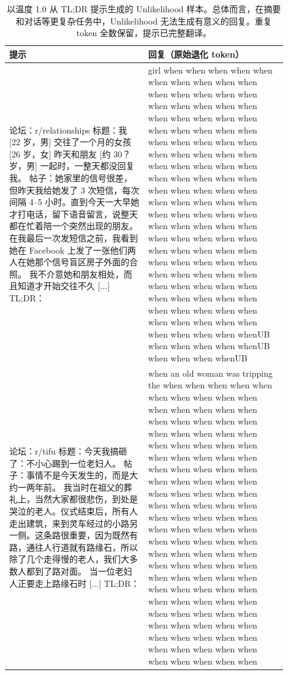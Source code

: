 \begingroup\setlength{\LTcapwidth}{.97\linewidth}
\begin{longtable}{p{0.45\linewidth}p{0.45\linewidth}}
\caption{以温度 1.0 从 TL;DR 提示生成的 Unlikelihood 样本。总体而言，在摘要和对话等更复杂任务中，Unlikelihood 无法生成有意义的回复。重复 token 全数保留，提示已完整翻译。}\label{dpo-tab:unlikelihood_generations}\\

        \toprule
        \textbf{提示} & \textbf{回复（原始退化 token）} \\
        \midrule
论坛：r/relationships \newline 标题：我 [22 岁，男] 交往了一个月的女孩 [26 岁，女] 昨天和朋友 [约 30？岁，男] 一起时，一整天都没回复我。\newline
帖子：她家里的信号很差，但昨天我给她发了 3 次短信，每次间隔 4--5 小时。直到今天一大早她才打电话，留下语音留言，说整天都在忙着陪一个突然出现的朋友。\newline
在我最后一次发短信之前，我看到她在 Facebook 上发了一张他们两人在她那个信号盲区房子外面的合照。\newline
我不介意她和朋友相处，而且知道才开始交往不久 [$\dots$] TL;DR：
        & girl when when when when when when when when when when when when when when when when when when when when when when when when when when when when when when when when when when when when when when when when when when when when when when when when when when when when when when when when when when when when when when when when when when when when when when when when when when when when when when when when when when when when when when when when when when when when when when when when when when when when when when when when when when when when when when when when when when whenUB when when when when whenUB when when when whenUB \\
        \midrule
论坛：r/tifu \newline
标题：今天我搞砸了：不小心踢到一位老妇人。\newline
帖子：事情不是今天发生的，而是大约一两年前。\newline
我当时在祖父的葬礼上，当然大家都很悲伤，到处是哭泣的老人。仪式结束后，所有人走出建筑，来到灵车经过的小路另一侧。这条路很重要，因为既然有路，通往人行道就有路缘石，所以除了几个走得慢的老人，我们大多数人都到了路对面。\newline
当一位老妇人正要走上路缘石时 [$\dots$] TL;DR：
        & when an old woman was tripping the when when when when when when when when when when when when when when when when when when when when when when when when when when when when when when when when when when when when when when when when when when when when when when when when when when when when when when when when when when when when when when when when when when when when when when when when when when when when when when when when when when when when when when when when when when when when when when when when when when when when when when when when when when when when when when when when when when when when when when when when \\
        \bottomrule
    
\end{longtable}
